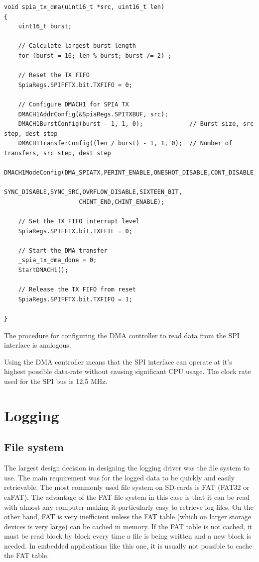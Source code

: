\begin{verbatim}
void spia_tx_dma(uint16_t *src, uint16_t len)
{
    uint16_t burst;

    // Calculate largest burst length
    for (burst = 16; len % burst; burst /= 2) ;

    // Reset the TX FIFO
    SpiaRegs.SPIFFTX.bit.TXFIFO = 0;

    // Configure DMACH1 for SPIA TX
    DMACH1AddrConfig(&SpiaRegs.SPITXBUF, src);
    DMACH1BurstConfig(burst - 1, 1, 0);             // Burst size, src step, dest step
    DMACH1TransferConfig((len / burst) - 1, 1, 0);  // Number of transfers, src step, dest step
    DMACH1ModeConfig(DMA_SPIATX,PERINT_ENABLE,ONESHOT_DISABLE,CONT_DISABLE,
                     SYNC_DISABLE,SYNC_SRC,OVRFLOW_DISABLE,SIXTEEN_BIT,
                     CHINT_END,CHINT_ENABLE);

    // Set the TX FIFO interrupt level
    SpiaRegs.SPIFFTX.bit.TXFFIL = 0;

    // Start the DMA transfer
    _spia_tx_dma_done = 0;
    StartDMACH1();

    // Release the TX FIFO from reset
    SpiaRegs.SPIFFTX.bit.TXFIFO = 1;

}
\end{verbatim}

The procedure for configuring the DMA controller to read data from the SPI interface is analogous.

Using the DMA controller means that the SPI interface can operate at it's highest possible data-rate without causing significant CPU usage. The clock rate used for the SPI bus is 12,5 MHz.

\section{Logging} \label{logging}

\subsection{File system}

The largest design decision in designing the logging driver was the file system to use. The main requirement was for the logged data to be quickly and easily retrievable. The most commonly used file system on SD-cards is FAT (FAT32 or exFAT). The advantage of the FAT file system in this case is that it can be read with almost any computer making it particularly easy to retrieve log files. On the other hand, FAT is very inefficient unless the FAT table (which on larger storage devices is very large) can be cached in memory. If the FAT table is not cached, it must be read block by block every time a file is being written and a new block is needed. In embedded applications like this one, it is usually not possible to cache the FAT table.

